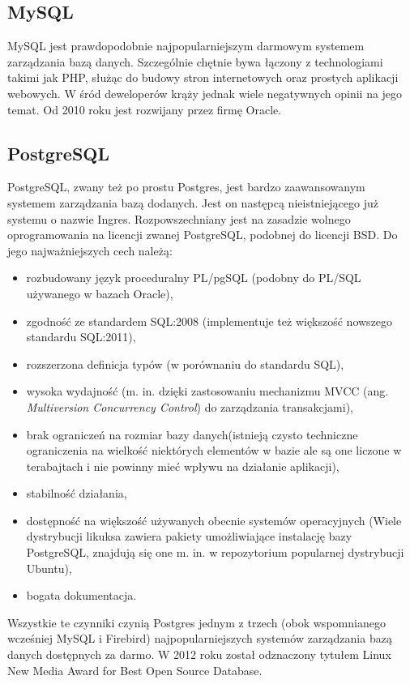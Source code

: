 \subsection[MySQL][MySQL]{MySQL} 
MySQL jest prawdopodobnie najpopularniejszym darmowym systemem zarządzania bazą danych. Szczególnie chętnie bywa łączony z technologiami takimi jak PHP, służąc do budowy stron internetowych oraz prostych aplikacji webowych. W śród deweloperów krąży jednak wiele negatywnych opinii na jego temat. Od 2010 roku jest rozwijany przez firmę Oracle.

\subsection[PostgreSQL][PostgreSQL]{PostgreSQL} 
PostgreSQL, zwany też po prostu Postgres, jest bardzo zaawansowanym systemem zarządzania bazą dodanych. Jest on następcą nieistniejącego już systemu o nazwie Ingres. Rozpowszechniany jest na zasadzie wolnego oprogramowania na licencji zwanej PostgreSQL, podobnej do licencji BSD. Do jego najważniejszych cech należą:
\begin{itemize}
	\item rozbudowany język proceduralny PL/pgSQL (podobny do PL/SQL używanego w bazach Oracle),
	\item zgodność ze standardem SQL:2008 (implementuje też większość nowszego standardu SQL:2011),
	\item rozszerzona definicja typów (w porównaniu do standardu SQL),
	\item wysoka wydajność (m. in. dzięki zastosowaniu mechanizmu MVCC (ang. \textit{Multiversion Concurrency Control}) do zarządzania transakcjami),
	\item brak ograniczeń na rozmiar bazy danych(istnieją czysto techniczne ograniczenia na wielkość niektórych elementów w bazie ale są one liczone w terabajtach i nie powinny mieć wpływu na działanie aplikacji),
	\item stabilność działania,
	\item dostępność na większość używanych obecnie systemów operacyjnych (Wiele dystrybucji likuksa zawiera pakiety umożliwiające instalację bazy PostgreSQL, znajdują się one m. in. w repozytorium popularnej dystrybucji Ubuntu),
	\item bogata dokumentacja.
\end{itemize}
Wszystkie te czynniki czynią Postgres jednym z trzech (obok wspomnianego wcześniej MySQL i Firebird) najpopularniejszych systemów zarządzania bazą danych dostępnych za darmo. W 2012 roku został odznaczony tytułem Linux New Media Award for Best Open Source Database.

